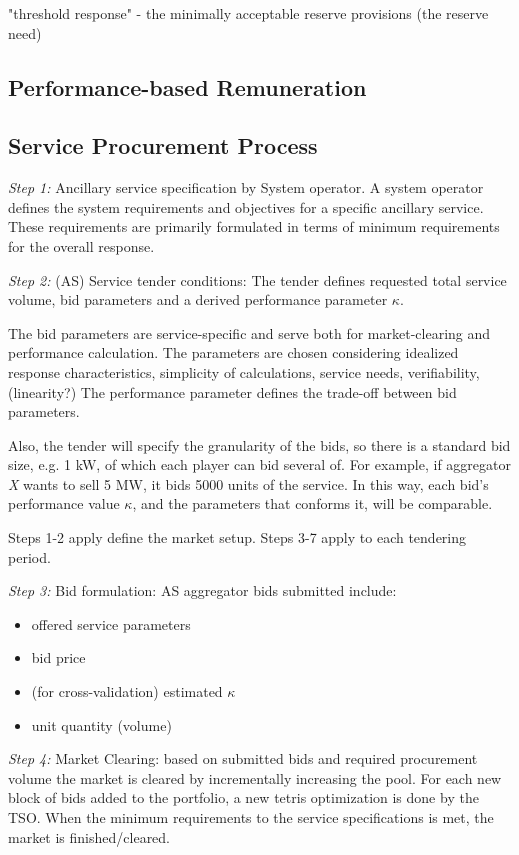 "threshold response" - the minimally acceptable reserve provisions (the reserve need)



\subsection{Performance-based Remuneration}

\subsection{Service Procurement Process}
\textit{Step 1:} Ancillary service specification by System operator. A system operator defines the system requirements and objectives for a specific ancillary service. These requirements are primarily formulated in terms of minimum requirements for the overall response. 

\textit{Step 2:} (AS) Service tender conditions: 
The tender defines requested total service volume, bid parameters and a derived performance parameter $\kappa$. 

The bid parameters are service-specific and serve both for market-clearing and performance calculation. The parameters are chosen considering idealized response characteristics, simplicity of calculations, service needs, verifiability, (linearity?) \kh{[...tbd...] }
The performance parameter defines the trade-off between bid parameters. 

Also, the tender will specify the granularity of the bids, so there is a standard bid size, e.g. 1 kW, of which each player can bid several of. For example, if aggregator \emph{X} wants to sell 5 MW, it bids 5000 units of the service. In this way, each bid's performance value $\kappa$, and the parameters that conforms it, will be comparable.

Steps 1-2 apply define the market setup. Steps 3-7 apply to each tendering period. 

\textit{Step 3:} Bid formulation:
AS aggregator bids submitted include: 
\begin{itemize}
\item offered service parameters
\item bid price
\item (for cross-validation) estimated $\kappa$
\item unit quantity (volume)
\end{itemize}


\textit{Step 4:} Market Clearing: based on submitted bids and required procurement volume the market is cleared by incrementally increasing the pool. For each new block of bids added to the portfolio, a new tetris optimization is done by the TSO. When the minimum requirements to the service specifications is met, the market is finished/cleared.

